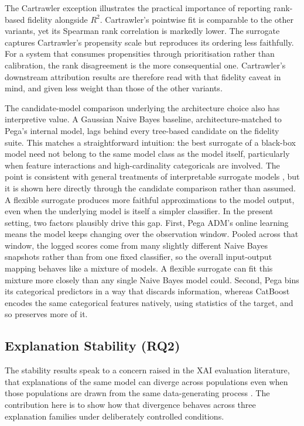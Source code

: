\documentclass[oneside]{memoir} %
\begin{document}
The Cartrawler exception illustrates the practical importance of reporting rank-based fidelity alongside $R^2$. Cartrawler's pointwise fit is comparable to the other variants, yet its Spearman rank correlation is markedly lower. The surrogate captures Cartrawler's propensity scale but reproduces its ordering less faithfully. For a system that consumes propensities through prioritisation rather than calibration, the rank disagreement is the more consequential one. Cartrawler's downstream attribution results are therefore read with that fidelity caveat in mind, and given less weight than those of the other variants.

The candidate-model comparison underlying the architecture choice also has interpretive value. A Gaussian Naive Bayes baseline, architecture-matched to Pega's internal model, lags behind every tree-based candidate on the fidelity suite. This matches a straightforward intuition: the best surrogate of a black-box model need not belong to the same model class as the model itself, particularly when feature interactions and high-cardinality categoricals are involved. The point is consistent with general treatments of interpretable surrogate models \parencite{molnar_interpretable_2025}, but it is shown here directly through the candidate comparison rather than assumed. A flexible surrogate produces more faithful approximations to the model output, even when the underlying model is itself a simpler classifier. In the present setting, two factors plausibly drive this gap. First, Pega ADM's online learning means the model keeps changing over the observation window. Pooled across that window, the logged scores come from many slightly different Naive Bayes snapshots rather than from one fixed classifier, so the overall input-output mapping behaves like a mixture of models. A flexible surrogate can fit this mixture more closely than any single Naive Bayes model could. Second, Pega bins its categorical predictors in a way that discards information, whereas CatBoost encodes the same categorical features natively, using statistics of the target, and so preserves more of it.

\subsection{Explanation Stability (RQ2)}

The stability results speak to a concern raised in the XAI evaluation literature, that explanations of the same model can diverge across populations even when those populations are drawn from the same data-generating process \parencite{alvarez-melis_robustness_2018, ribeiro_why_2016, vilone_explainable_2020}. The contribution here is to show how that divergence behaves across three explanation families under deliberately controlled conditions.
\end{document}
